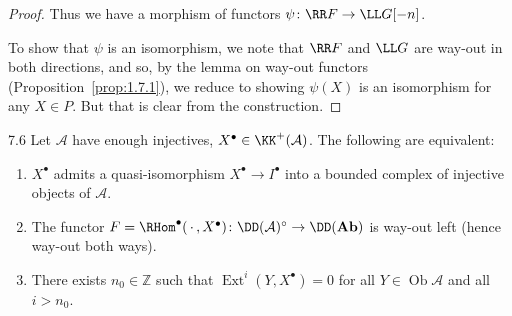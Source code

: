 \begin{proof}
Thus we have a morphism of functors $\psi\colon \RR F \to \LL G[-n]$.

To show that $\psi$ is an isomorphism, we note that $\RR F$ and $\LL G$ are way-out in both directions, and so, by the lemma on way-out functors (Proposition~\ref{prop:1.7.1}), we reduce to showing $\psi(X)$ is an isomorphism for any $X\in P$. But that is clear from the construction.
\end{proof}

\begin{bookproposition}{7.6}\label{prop:1.7.6}
Let $\mathcal{A}$ have enough injectives, $X^\bullet\in\KK^+(\mathcal{A})$. The following are equivalent:
\begin{enumerate}
\item[(i)] $X^\bullet$ admits a quasi-isomorphism $X^\bullet\rightarrow I^\bullet$ into a bounded complex of injective objects of $\mathcal{A}$.
\item[(ii)] The functor $F=\RHom^\bullet(\,\cdot\,,X^\bullet)\colon\DD(\mathcal{A})^\circ\to\DD(\mathbf{Ab})$ is way-out left (hence way-out both ways).
\item[(iii)] There exists $n_0\in\mathbb{Z}$ such that $\operatorname{Ext}^i(Y,X^\bullet)=0$ for all $Y\in\operatorname{Ob}\mathcal{A}$ and all $i>n_0$.
\end{enumerate}
\end{bookproposition}

